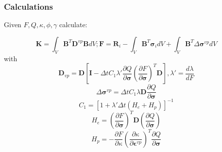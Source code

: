 \documentclass[usenames,dvipsnames]{beamer}
\begin{document}
\begin{frame}
  
  \frametitle{Calculations}
  
  Given $F, Q, \kappa, \phi, \gamma$ calculate:

  \begin{equation} \label{EqImplicitFEM}
    \mathbf{K} = \int_V \mathbf{B}^T \mathbf{D}^{vp} \mathbf{B} dV; \mathbf{F} = \mathbf{R}_i - \int_V \mathbf{B}^T \bm{\sigma}_i dV + \int_V \mathbf{B}^T
    \Delta
    \bm{\sigma}^{vp} dV
    \end{equation}
    with
    \begin{equation}
    \mathbf{D}_{vp} =
    \mathbf{D} \left [
    \mathbf{I} - {\Delta t} C_1 \lambda' \frac{\partial Q}{\partial \bm{\sigma}} \left ( \frac{\partial F}{\partial
    \bm{\sigma}} \right )^{T} \mathbf{D}
    \right ], \lambda' = \frac{d \lambda}{d F}
    \end{equation}
    \begin{equation}
    \Delta \bm{\sigma}^{vp} = \Delta t C_1 \lambda \mathbf{D} \frac{\partial Q}{\partial \bm{\sigma}}
    \end{equation}
    \begin{equation}
    C_1 = [1 + \lambda' {\Delta t} (H_e + H_p)]^{-1}
    \end{equation}
    \begin{equation}
    \label{HEE}
    H_e = \left ( \frac{\partial F}{\partial \bm{\sigma}} \right )^T \mathbf{D} (\frac{\partial Q}{\partial \bm{\sigma}})
    \end{equation}
    \begin{equation}
    H_p = -\frac{\partial F}{\partial \kappa} \left ( \frac{\partial \kappa}{\partial \bm{\epsilon}^{vp}}
    \right )^T \frac{\partial Q}{\partial \bm{\sigma}}
    \end{equation}
  
  \end{frame}
  
  
\end{document}

